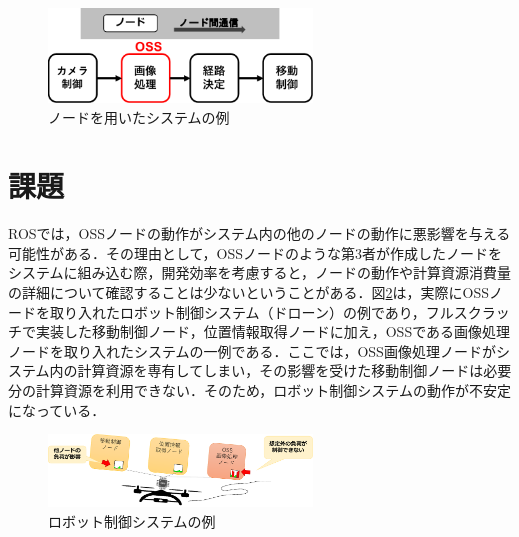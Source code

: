 \documentclass[11pt]{ujarticle} %
\begin{document}
\begin{figure}[t]
   \centering
   \includegraphics[width=7cm]{img/nodeExp.pdf}
   \caption{ノードを用いたシステムの例}
   \label{fig:nodeExp}
\end{figure}

\section{課題}
ROSでは，OSSノードの動作がシステム内の他のノードの動作に悪影響を与える可能性がある．その理由として，OSSノードのような第3者が作成したノードをシステムに組み込む際，開発効率を考慮すると，ノードの動作や計算資源消費量の詳細について確認することは少ないということがある．図\ref{fig:before}は，実際にOSSノードを取り入れたロボット制御システム（ドローン）の例であり，フルスクラッチで実装した移動制御ノード，位置情報取得ノードに加え，OSSである画像処理ノードを取り入れたシステムの一例である．ここでは，OSS画像処理ノードがシステム内の計算資源を専有してしまい，その影響を受けた移動制御ノードは必要分の計算資源を利用できない．そのため，ロボット制御システムの動作が不安定になっている．

\begin{figure}[t]
   \centering
   \includegraphics[width=7cm]{img/before.pdf}
   \caption{ロボット制御システムの例}
   \label{fig:before}
\end{figure}
\end{document}
